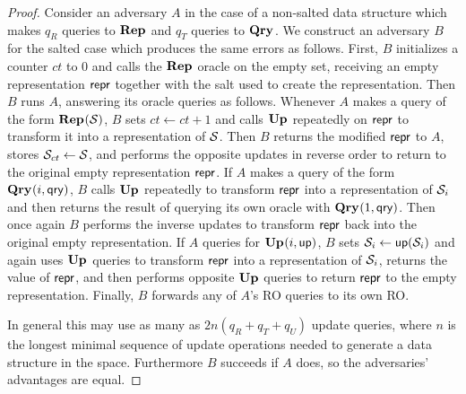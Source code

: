 \begin{proof}
Consider an adversary $A$ in the case of a non-salted data structure which makes $q_R$ queries to $\textup{\textbf{Rep}}\hspace{0.5pt}$ and $q_T$ queries to $\textup{\textbf{Qry}}\hspace{0.5pt}$. We construct an adversary $B$ for the salted case which produces the same errors as follows. First, $B$ initializes a counter $ct$ to 0 and calls the $\textup{\textbf{Rep}}\hspace{0.5pt}$ oracle on the empty set, receiving an empty representation $\mathsf{repr}$ together with the salt used to create the representation. Then $B$ runs $A$, answering its oracle queries as follows. Whenever $A$ makes a query of the form $\textup{\textbf{Rep}}\hspace{0.5pt}(\mathcal{S})$, $B$ sets $ct \gets ct + 1$ and calls $\textup{\textbf{Up}}\hspace{0.5pt}$ repeatedly on $\mathsf{repr}$ to transform it into a representation of $\mathcal{S}$. Then $B$ returns the modified $\mathsf{repr}$ to $A$, stores $\mathcal{S}_{ct} \gets \mathcal{S}$, and performs the opposite updates in reverse order to return to the original empty representation $\mathsf{repr}$. If $A$ makes a query of the form $\textup{\textbf{Qry}}\hspace{0.5pt}(i,\mathsf{qry})$, $B$ calls $\textup{\textbf{Up}}\hspace{0.5pt}$ repeatedly to transform $\mathsf{repr}$ into a representation of $\mathcal{S}_i$ and then returns the result of querying its own oracle with $\textup{\textbf{Qry}}\hspace{0.5pt}(1, \mathsf{qry})$. Then once again $B$ performs the inverse updates to transform $\mathsf{repr}$ back into the original empty representation. If $A$ queries for $\textup{\textbf{Up}}\hspace{0.5pt}(i, \mathsf{up})$, $B$ sets $\mathcal{S}_i \gets \mathsf{up}(\mathcal{S}_i)$ and again uses $\textup{\textbf{Up}}\hspace{0.5pt}$ queries to transform $\mathsf{repr}$ into a representation of $\mathcal{S}_i$, returns the value of $\mathsf{repr}$, and then performs opposite $\textup{\textbf{Up}}\hspace{0.5pt}$ queries to return $\mathsf{repr}$ to the empty representation. Finally, $B$ forwards any of $A$'s RO queries to its own RO.

In general this may use as many as $2n(q_R+q_T+q_U)$ update queries, where $n$ is the longest minimal sequence of update operations needed to generate a data structure in the space. Furthermore $B$ succeeds if $A$ does, so the adversaries' advantages are equal.\missingqed
\end{proof}




